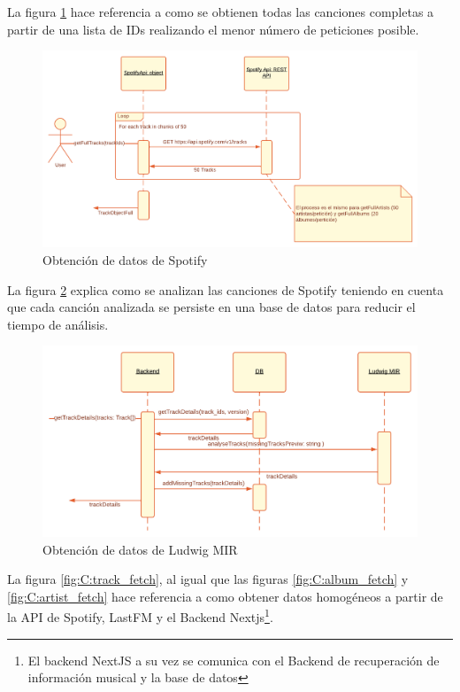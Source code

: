 La figura \ref{fig:C:spotify_fetch} hace referencia a como se obtienen todas las canciones completas a partir de una lista de IDs realizando el menor número de peticiones posible. 

\begin{figure}
    \centering
    \includegraphics{img/C/spotify_data_fetch.png}
    \caption{Obtención de datos de Spotify}
    \label{fig:C:spotify_fetch}
\end{figure}

La figura \ref{fig:C:ludwig_fetch} explica como se analizan las canciones de Spotify teniendo en cuenta que cada canción analizada se persiste en una base de datos para reducir el tiempo de análisis. 



\begin{figure}
    \centering
    \includegraphics[]{img/C/ludwig_data_fetch.png}
    \caption{Obtención de datos de Ludwig MIR}
    \label{fig:C:ludwig_fetch}
\end{figure}

La figura \ref{fig:C:track_fetch}, al igual que las figuras \ref{fig:C:album_fetch} y \ref{fig:C:artist_fetch} hace referencia a como obtener datos homogéneos a partir de la API de Spotify, LastFM y el Backend Nextjs\footnote{El backend NextJS a su vez se comunica con el Backend de recuperación de información musical y la base de datos}.

